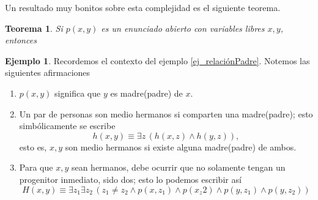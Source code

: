\documentclass{book}
\newtheorem{thm}{Teorema}[chapter]
\theoremstyle{definition}
\newtheorem{ejm}{Ejemplo}[chapter]
\begin{document}
Un resultado muy bonitos sobre esta complejidad es el siguiente teorema. %
\begin{thm}
	Si $p(x,y)$ es un enunciado abierto con variables libres $x,y$, entonces %
	
	\label{thm_implicacionesOrdenCuantificadores}
\end{thm}

\begin{ejm}
	Recordemos el contexto del ejemplo \ref{ej_relaciónPadre}.
	Notemos las siguientes afirmaciones
	\begin{enumerate}
		\item $p(x,y)$ significa que $y$ es madre(padre) de $x$.
		\item Un par de personas son medio hermanos si comparten una madre(padre); esto simbólicamente se escribe \[h(x,y) \equiv \exists z \, \left( h(x,z) \wedge h(y,z)\right),\]
		esto es, $x,y$ son medio hermanos si existe alguna madre(padre) de ambos.
		
		\item Para que $x,y$ sean hermanos, debe ocurrir que no solamente tengan un progenitor inmediato, sido dos; esto lo podemos escribir así
		\[H(x,y)\equiv \exists z_1 \exists z_2 \, \left(z_1 \neq z_2 \wedge p(x,z_1) \wedge p(x_z2) \wedge p(y,z_1) \wedge p(y,z_2) \right) \]
		

\end{enumerate}
\end{ejm}
\end{document}
